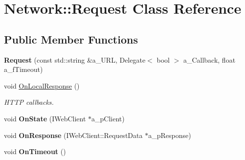 \hypertarget{class_network_1_1_request}{}\section{Network\+:\+:Request Class Reference}
\label{class_network_1_1_request}
\subsection*{Public Member Functions}
\begin{DoxyCompactItemize}
\item 
\mbox{\label{class_network_1_1_request_a27ad746f2b5c3547c25d104af889a35a}} 
{\bfseries Request} (const std\+::string \&a\+\_\+\+U\+RL, Delegate$<$ bool $>$ a\+\_\+\+Callback, float a\+\_\+f\+Timeout)
\item 
\mbox{\label{class_network_1_1_request_a998d7242598a5f764f17e4f4d3d3123f}} 
void \hyperlink{class_network_1_1_request_a998d7242598a5f764f17e4f4d3d3123f}{On\+Local\+Response} ()
\begin{DoxyCompactList}\small\item\em H\+T\+TP callbacks. \end{DoxyCompactList}\item 
\mbox{\label{class_network_1_1_request_a76ebfe45a6763b945954f7ba63a97129}} 
void {\bfseries On\+State} (I\+Web\+Client $\ast$a\+\_\+p\+Client)
\item 
\mbox{\label{class_network_1_1_request_a582347ac165ec5ac66525e11fd2b248a}} 
void {\bfseries On\+Response} (I\+Web\+Client\+::\+Request\+Data $\ast$a\+\_\+p\+Response)
\item 
\mbox{\label{class_network_1_1_request_a1a9a7a04d46bed75f2ee1c16faeda623}} 
void {\bfseries On\+Timeout} ()
\end{DoxyCompactItemize}
